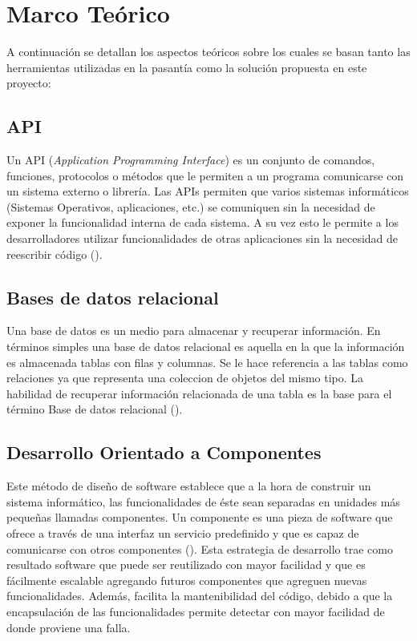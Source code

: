 \chapter{Marco Teórico}
\label{capitulo2}

A continuación se detallan los aspectos teóricos sobre los cuales se basan
tanto las herramientas utilizadas en la pasantía como la solución propuesta
en este proyecto:

\section{API}
Un API (\emph{Application Programming Interface}) es un conjunto de comandos,
funciones, protocolos o métodos que le permiten a un programa comunicarse
con un sistema externo o librería. Las APIs permiten que varios sistemas
informáticos (Sistemas Operativos, aplicaciones, etc.) se comuniquen sin la
necesidad de exponer la funcionalidad interna de cada sistema. A su vez esto
le permite a los desarrolladores utilizar funcionalidades de otras aplicaciones
sin la necesidad de reescribir código (\cite{API}).

\section{Bases de datos relacional}

Una base de datos es un medio para almacenar y recuperar información. En términos simples
una base de datos relacional es aquella en la que la información es almacenada tablas con
filas y columnas. Se le hace referencia a las tablas como relaciones ya que representa una
coleccion de objetos del mismo tipo. La habilidad de recuperar información relacionada de una
tabla es la base para el término Base de datos relacional (\cite{RELACIONAL}).

\section{Desarrollo Orientado a Componentes}

Este método de diseño de software establece que a la hora de construir un sistema
informático, las funcionalidades de éste sean separadas en unidades más pequeñas
llamadas componentes. Un componente es una pieza de software que ofrece a través
de una interfaz un servicio predefinido y que es capaz de comunicarse con otros
componentes (\cite{COMPONENT}). Esta estrategia de desarrollo trae como resultado
software que puede ser reutilizado con mayor facilidad y que es fácilmente escalable
agregando futuros componentes que agreguen nuevas funcionalidades. Además, facilita la
mantenibilidad del código, debido a que la encapsulación de las funcionalidades permite
detectar con mayor facilidad de donde proviene una falla.


